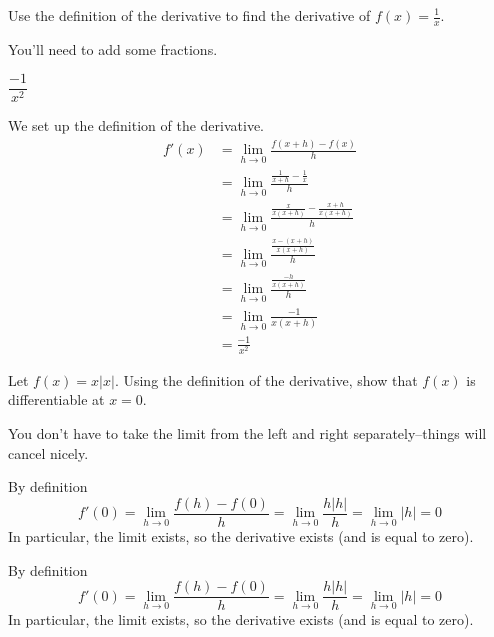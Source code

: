 \begin{question}Use the definition of the derivative to find the derivative of
$f(x)=\frac{1}{x}$.
\end{question}
\begin{hint} You'll need to add some fractions.
\end{hint}
\begin{answer} $\dfrac{-1}{x^2}$
\end{answer}
\begin{solution}
We set up the definition of the derivative.
\begin{align*}
f'(x)&=\lim_{h \rightarrow 0}\frac{f(x+h)-f(x)}{h}\\
&=\lim_{h \rightarrow 0}\frac{\frac{1}{x+h}-\frac{1}{x}}{h}\\
&=\lim_{h \rightarrow 0}\frac{\frac{x}{x(x+h)}-\frac{x+h}{x(x+h)}}{h}\\
&=\lim_{h \rightarrow 0}\frac{\frac{x-(x+h)}{x(x+h)}}{h}\\
&=\lim_{h \rightarrow 0}\frac{\frac{-h}{x(x+h)}}{h}\\
&=\lim_{h \rightarrow 0}\frac{-1}{x(x+h)}\\
&=\frac{-1}{x^2}
\end{align*}
\end{solution}


\begin{question}[2007H]
Let $f(x) = x|x|$.
Using the definition of the derivative, show that
$f(x)$ is differentiable at $x = 0$.
\end{question}
\begin{hint}
You don't have to take the limit from the left and right separately--things will cancel nicely.
\end{hint}
\begin{answer}
 By definition
$$
f'(0)=\lim_{h\rightarrow 0}\frac{f(h)-f(0)}{h}
     =\lim_{h\rightarrow 0}\frac{h|h|}{h}
     =\lim_{h\rightarrow 0}|h|=0
$$
In particular, the limit exists, so the derivative exists (and is equal to zero).
\end{answer}
\begin{solution}
 By definition
$$
f'(0)=\lim_{h\rightarrow 0}\frac{f(h)-f(0)}{h}
     =\lim_{h\rightarrow 0}\frac{h|h|}{h}
     =\lim_{h\rightarrow 0}|h|=0
$$
In particular, the limit exists, so the derivative exists (and is equal to zero).
\end{solution}




